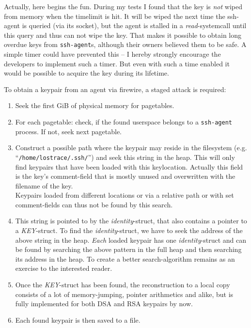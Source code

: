 Actually, here begins the fun. During my tests I found that the key is
\emph{not} wiped from memory when the timelimit is hit. It will be wiped the
next time the ssh-agent is queried (via its socket), but the agent is stalled in
a \emph{read}-systemcall until this query and thus can not wipe the key. That
makes it possible to obtain long overdue keys from \texttt{ssh-agent}s, although
their owners believed them to be safe. A simple timer could have prevented this
-- I hereby strongly encourage the developers to implement such a timer. But
even with such a time enabled it would be possible to acquire the key during its
lifetime.

To obtain a keypair from an agent via firewire, a staged attack is required:

\begin{enumerate}

	\item Seek the first GiB of physical memory for pagetables.

	\item For each pagetable: check, if the found userspace belongs to a
	\texttt{ssh-agent} process. If not, seek next pagetable.

	\item Construct a possible path where the keypair may reside in the
	filesystem (e.g. ``\texttt{/home/lostrace/.ssh/}'') and seek this string
	in the heap. This will only find keypairs that have been loaded with
	this keylocation. Actually this field is the key's comment-field that is
	mostly unused and overwritten with the filename of the key. \\ Keypairs
	loaded from different locations or via a relative path or with set
	comment-fields can thus not be found by this search.
	
	\item This string is pointed to by the \emph{identity}-struct, that also
	contains a pointer to a \emph{KEY}-struct. To find the
	\emph{identity}-struct, we have to seek the address of the above string
	in the heap. \emph{Each} loaded keypair has one \emph{identity}-struct
	and can be found by searching the above pattern in the full heap and
	then searching its address in the heap.	To create a better
	search-algorithm remains as an exercise to the interested reader.

	\item Once the \emph{KEY}-struct has been found, the reconstruction to a
	local copy consists of a lot of memory-jumping, pointer arithmetics and
	alike, but is fully implemented for both DSA and RSA keypairs by now.

	\item Each found keypair is then saved to a file.
	
\end{enumerate}


